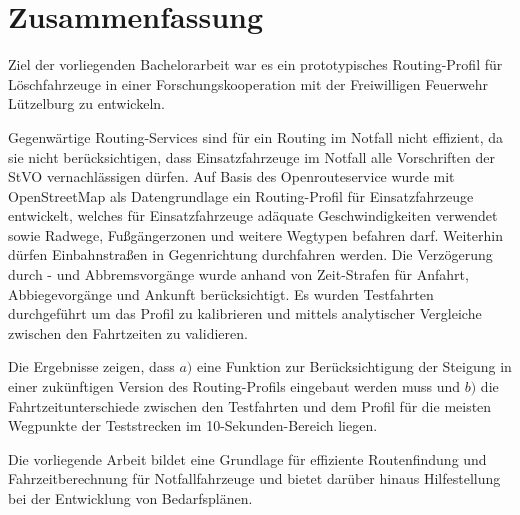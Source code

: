 {\centering\section*{Zusammenfassung}}

\vspace{1cm}

Ziel der vorliegenden Bachelorarbeit war es ein prototypisches Routing-Profil für Löschfahrzeuge in einer Forschungskooperation mit der Freiwilligen Feuerwehr Lützelburg zu entwickeln.
\medskip

Gegenwärtige Routing-Services sind für ein Routing im Notfall nicht effizient, da sie nicht berücksichtigen, dass Einsatzfahrzeuge im Notfall alle Vorschriften der StVO vernachlässigen dürfen.
Auf Basis des Openrouteservice wurde mit OpenStreetMap als Datengrundlage ein Routing-Profil für Einsatzfahrzeuge entwickelt, welches für Einsatzfahrzeuge adäquate Geschwindigkeiten verwendet sowie Radwege, Fußgängerzonen und weitere Wegtypen befahren darf. Weiterhin dürfen Einbahnstraßen in Gegenrichtung durchfahren werden.
Die Verzögerung durch - und Abbremsvorgänge wurde anhand von Zeit-Strafen für Anfahrt, Abbiegevorgänge und Ankunft berücksichtigt.
Es wurden Testfahrten durchgeführt um das Profil zu kalibrieren und mittels analytischer Vergleiche zwischen den Fahrtzeiten zu validieren.\par
Die Ergebnisse zeigen, dass \newline $a)$ eine Funktion zur Berücksichtigung der Steigung in einer zukünftigen Version des Routing-Profils eingebaut werden muss und \newline $b)$ die Fahrtzeitunterschiede zwischen den Testfahrten und dem Profil für die meisten Wegpunkte der Teststrecken im 10-Sekunden-Bereich liegen.
\bigskip

Die vorliegende Arbeit bildet eine Grundlage für effiziente Routenfindung und Fahrzeitberechnung für Notfallfahrzeuge und bietet darüber hinaus Hilfestellung bei der Entwicklung von Bedarfsplänen.